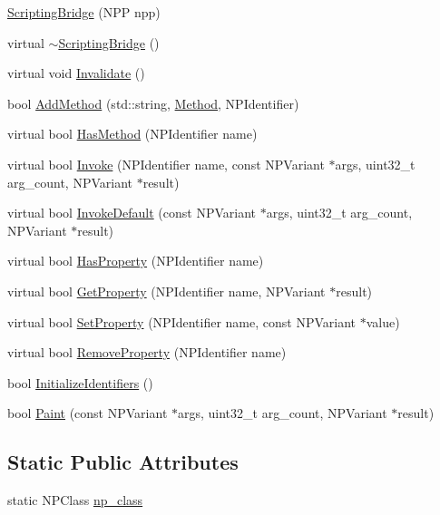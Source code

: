 \begin{DoxyCompactItemize}
\item 
\hyperlink{classbridge_1_1_scripting_bridge_a9f6cceea3738d76e33f47ba8ad5f72d9}{ScriptingBridge} (NPP npp)
\item 
virtual \hyperlink{classbridge_1_1_scripting_bridge_ac47a1623f245bd55f96ea8cb007b24cb}{$\sim$ScriptingBridge} ()
\item 
virtual void \hyperlink{classbridge_1_1_scripting_bridge_a956430a5ae42b3e30c3e1b4655322061}{Invalidate} ()
\item 
bool \hyperlink{classbridge_1_1_scripting_bridge_a24f9e87d1beed97f7231010636d5af55}{AddMethod} (std::string, \hyperlink{classbridge_1_1_scripting_bridge_aa2d60d52b4e91aa7659850b73f393727}{Method}, NPIdentifier)
\item 
virtual bool \hyperlink{classbridge_1_1_scripting_bridge_af968e6487c5cc9e2566118634c0ab561}{HasMethod} (NPIdentifier name)
\item 
virtual bool \hyperlink{classbridge_1_1_scripting_bridge_a84f78dde38b524b61e72afebf7210483}{Invoke} (NPIdentifier name, const NPVariant $\ast$args, uint32\_\-t arg\_\-count, NPVariant $\ast$result)
\item 
virtual bool \hyperlink{classbridge_1_1_scripting_bridge_aec42e4cce5b1ff9187d98b88b07d11d3}{InvokeDefault} (const NPVariant $\ast$args, uint32\_\-t arg\_\-count, NPVariant $\ast$result)
\item 
virtual bool \hyperlink{classbridge_1_1_scripting_bridge_ad2cb9f2b860ba05a86c10f0824699e33}{HasProperty} (NPIdentifier name)
\item 
virtual bool \hyperlink{classbridge_1_1_scripting_bridge_aa7f5844674672f5872137ffee032427e}{GetProperty} (NPIdentifier name, NPVariant $\ast$result)
\item 
virtual bool \hyperlink{classbridge_1_1_scripting_bridge_a918981b30a60d961232e693e7ac15652}{SetProperty} (NPIdentifier name, const NPVariant $\ast$value)
\item 
virtual bool \hyperlink{classbridge_1_1_scripting_bridge_aeda2f5f7f5669003d573cdc2f3dc8fe8}{RemoveProperty} (NPIdentifier name)
\item 
bool \hyperlink{classbridge_1_1_scripting_bridge_a86ef6533d8f6ed9573890f017c6084d9}{InitializeIdentifiers} ()
\item 
bool \hyperlink{classbridge_1_1_scripting_bridge_a44eeaa7c1de524f8df7f218c1b53233b}{Paint} (const NPVariant $\ast$args, uint32\_\-t arg\_\-count, NPVariant $\ast$result)
\end{DoxyCompactItemize}
\subsection*{Static Public Attributes}
\begin{DoxyCompactItemize}
\item 
static NPClass \hyperlink{classbridge_1_1_scripting_bridge_a7a3e8318e9e315a116729cebceac5fd9}{np\_\-class}
\end{DoxyCompactItemize}
